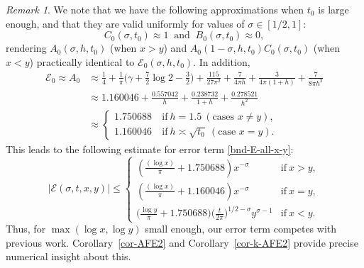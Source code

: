 \documentclass[11pt,letterpaper,oneside,reqno]{amsart}
\renewcommand{\^}[1]{\widehat{#1}}
\newcommand{\s}{\sigma}
\numberwithin{equation}{section}
\theoremstyle{remark}
\newtheorem*{remark}{Remark}
\newcommand*{\corref}[1]{Corollary~\ref{#1}}
\begin{document}
\begin{remark}
We note that we have the following approximations when $t_0$ is large enough, and that they are valid uniformly for values of $\sigma \in[1/2,1]$:
\[
C_0(\s,t_0)\approx 1\ \text{ and }\ B_0(\s,t_0)\approx 0,
\]
rendering $A_0(\s,h,t_0)$ (when $x > y$) and $A_0(1-\s,h,t_0) C_0(\s,t_0)$ (when $x < y$) practically identical to $\mathcal{E}_0(\s,h,t_0)$.
In addition, 
\begin{align*}
\mathcal{E}_0 \approx A_0 &\approx \frac{1}{4} + \frac{1}{\pi} \Big(\gamma + \frac{7}{2}\log 2 - \frac{3}{2}\Big) + \frac{115}{27\pi^2} 
+  \frac{7}{4\pi h}+ \frac{3}{4\pi(1+h)}  + \frac{7}{8\pi h^2}  \\
&\approx  1.160046+ \frac{0.557042}{h} + \frac{0.238732}{1+h}+\frac{0.278521}{h^2}
\\& \approx \begin{cases}
 1.750688&\ \text{if}\ h = 1.5\ (\text{cases } x\neq y),\\
1.160046 &\ \text{if}\ h \asymp \sqrt{t_0} \ (\text{case } x= y).
\end{cases}
\end{align*}
This leads to the following estimate for error term \eqref{bnd-E-all-x-y}:
\begin{equation}
\left|\mathcal{E}(\s,t, x, y)\right|
\leq 
\begin{cases}
  \left(\frac{(\log x)}{\pi}  +  1.750688 \right)x^{-\s} &\text{if}\ x > y,  \\
  \left(\frac{(\log x)}{\pi}  +1.160046 \right)x^{-\s} &\text{if}\ x = y,  \\
\Big(  \frac{\log y}{\pi}+ 1.750688  \Big) \Big(\frac{t}{2\pi}\Big)^{1/2-\sigma} y^{\sigma-1}  &\text{if}\ x<  y.
\end{cases}
\end{equation}
Thus, for $\max(\log x, \log y)$ small enough, our error term competes with previous work. 
\corref{cor-AFE2} and \corref{cor-k-AFE2} provide precise numerical insight about this. 
\end{remark}
%
\end{document}
